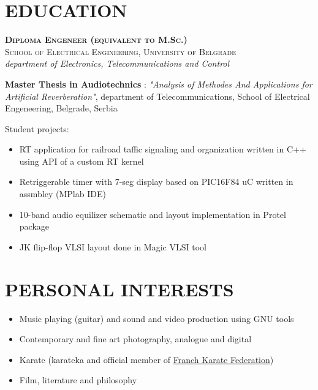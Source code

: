 \documentclass[a4paper, oneside, final]{scrartcl}
\begin{document}
\section{EDUCATION}

   \textbf{\textsc{Diploma Engeneer (equivalent to M.Sc.)}} \\
   \textsc{School of Electrical Engineering, University of Belgrade} \\
   \textit{department of Electronics, Telecommunications and Control}

   \textbf{Master Thesis in Audiotechnics} : \textit{"Analysis of Methodes And 
         Applications for Artificial Reverberation"}, department of 
         Telecommunications, School of Electrical Engeneering, Belgrade, Serbia

\medskip
   
   Student projects:

\begin{itemize}
   \item RT application for railroad taffic signaling 
            and organization written in C++ using API of a custom RT kernel
   \item Retriggerable timer with 7-seg display 
            based on PIC16F84 uC written in assmbley (MPlab IDE)
   \item 10-band audio equilizer schematic and 
            layout implementation in Protel package
   \item JK flip-flop VLSI layout done in Magic VLSI tool
\end{itemize}


\section{PERSONAL INTERESTS}
\begin{itemize}
   \item Music playing (guitar) and sound and video production using GNU
            tools
   \item Contemporary and fine art photography, analogue and digital 
   \item Karate (karateka and official member of
         \href{http://www.ffkarate.fr/}{Franch Karate Federation})
   \item Film, literature and philosophy
\end{itemize}
\end{document}
